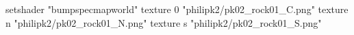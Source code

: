setshader "bumpspecmapworld"
    texture 0 "philipk2/pk02_rock01_C.png"
    texture n "philipk2/pk02_rock01_N.png"
    texture s "philipk2/pk02_rock01_S.png"